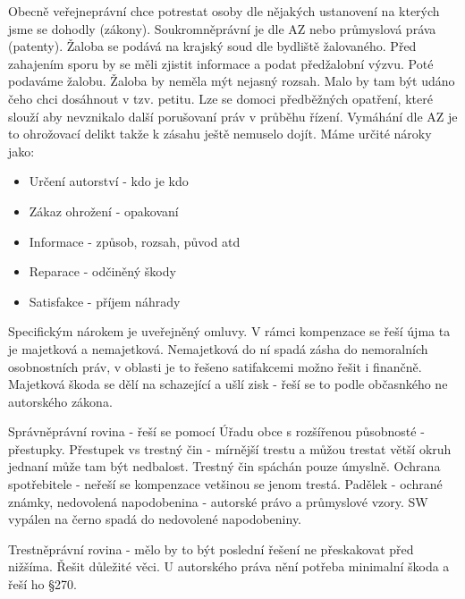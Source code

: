 \documentclass[12pt,a4paper,czech]{report}
\begin{document}
Obecně veřejneprávní chce potrestat osoby dle nějakých ustanovení na kterých jsme se dohodly (zákony).
Soukromněprávní je dle AZ nebo průmyslová práva (patenty). Žaloba se podává na krajský soud dle bydliště žalovaného. Před zahajením sporu by se měli zjistit informace a podat předžalobní výzvu. Poté podaváme žalobu. Žaloba by neměla mýt nejasný rozsah. Malo by tam být udáno čeho chci dosáhnout v tzv. petitu. Lze se domoci předběžných opatření, které slouží aby nevznikalo další porušovaní práv v průběhu řízení. Vymáhání dle AZ je to ohrožovací delikt takže k zásahu ještě nemuselo dojít. Máme určité nároky jako:
\begin{itemize}
    \item  Určení autorství - kdo je kdo
    \item Zákaz ohrožení - opakovaní
    \item Informace - způsob, rozsah, původ atd
    \item Reparace - odčiněný škody
    \item Satisfakce - příjem náhrady
\end{itemize}
Specifickým nárokem je uveřejněný omluvy. V rámci kompenzace se řeší újma ta je majetková a nemajetková. Nemajetková do ní spadá zásha do nemoralních osobnostních práv, v oblasti je to řešeno satifakcemi možno řešit i finančně. Majetková škoda se dělí na schazející a ušlí zisk - řeší se to podle občasnkého ne autorského zákona.

Správněprávní rovina - řeší se pomocí Úřadu obce s rozšířenou působnosté - přestupky. Přestupek vs trestný čin - mírnější trestu a můžou trestat větší okruh jednaní může tam být nedbalost. Trestný čin spáchán pouze úmyslně. Ochrana spotřebitele - neřeší se kompenzace vetšinou se jenom trestá. Padělek - ochrané známky, nedovolená napodobenina - autorské právo a průmyslové vzory. SW vypálen na černo spadá do nedovolené napodobeniny.

Trestněprávní rovina - mělo by to být poslední řešení ne přeskakovat před nižšíma. Řešit důležité věci. U autorského práva nění potřeba minimalní škoda a řeší ho §270. 


\end{document}
